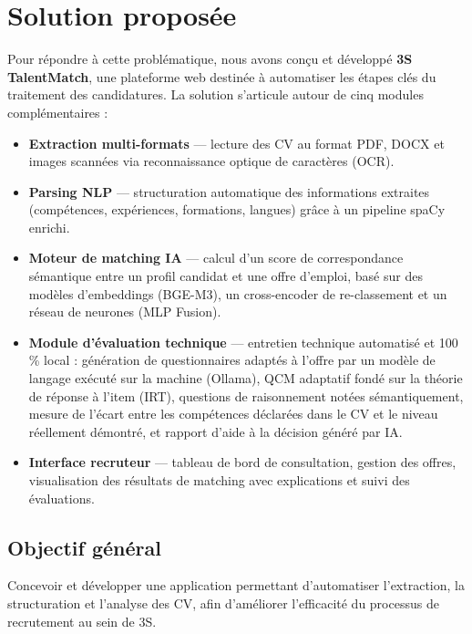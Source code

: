 \documentclass[12pt,a4paper]{report}
\begin{document}
\section{Solution proposée}

Pour répondre à cette problématique, nous avons conçu et développé \textbf{3S TalentMatch}, une plateforme web destinée à automatiser les étapes clés du traitement des candidatures. La solution s'articule autour de cinq modules complémentaires :

\begin{itemize}
  \item \textbf{Extraction multi-formats} — lecture des CV au format PDF, DOCX et images scannées via reconnaissance optique de caractères (OCR).
  \item \textbf{Parsing NLP} — structuration automatique des informations extraites (compétences, expériences, formations, langues) grâce à un pipeline spaCy enrichi.
  \item \textbf{Moteur de matching IA} — calcul d'un score de correspondance sémantique entre un profil candidat et une offre d'emploi, basé sur des modèles d'embeddings (BGE-M3), un cross-encoder de re-classement et un réseau de neurones (MLP Fusion).
  \item \textbf{Module d'évaluation technique} — entretien technique automatisé et 100\,\% local : génération de questionnaires adaptés à l'offre par un modèle de langage exécuté sur la machine (Ollama), QCM adaptatif fondé sur la théorie de réponse à l'item (IRT), questions de raisonnement notées sémantiquement, mesure de l'écart entre les compétences déclarées dans le CV et le niveau réellement démontré, et rapport d'aide à la décision généré par IA.
  \item \textbf{Interface recruteur} — tableau de bord de consultation, gestion des offres, visualisation des résultats de matching avec explications et suivi des évaluations.
\end{itemize}

\subsection*{Objectif général}

Concevoir et développer une application permettant d'automatiser l'extraction, la structuration et l'analyse des CV, afin d'améliorer l'efficacité du processus de recrutement au sein de 3S.
\end{document}
